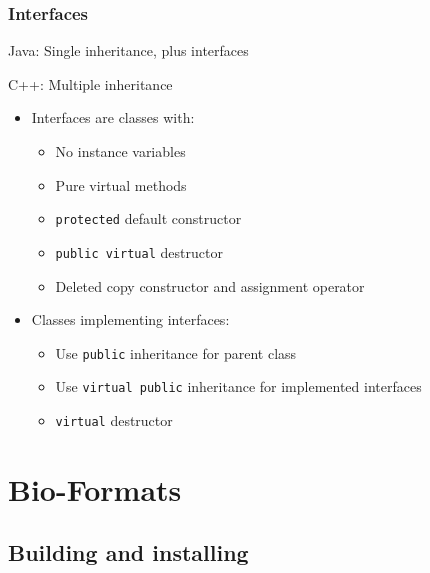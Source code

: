 \documentclass{beamer}
\begin{document}
\begin{frame}[fragile]
  \frametitle{Interfaces}
\begin{block}{Java: Single inheritance, plus interfaces}
\end{block}
\begin{block}{C++: Multiple inheritance}
  \begin{itemize}
  \item Interfaces are classes with:
    \begin{itemize}
      \item No instance variables
      \item Pure virtual methods
      \item \texttt{protected} default constructor
      \item \texttt{public virtual} destructor
      \item Deleted copy constructor and assignment operator
    \end{itemize}
  \item Classes implementing interfaces:
    \begin{itemize}
      \item Use \texttt{public} inheritance for parent class
      \item Use \texttt{virtual public} inheritance for implemented interfaces
      \item \texttt{virtual} destructor
    \end{itemize}
  \end{itemize}
\end{block}
\end{frame}

\section{Bio-Formats}
\subsection{Building and installing}
\end{document}
